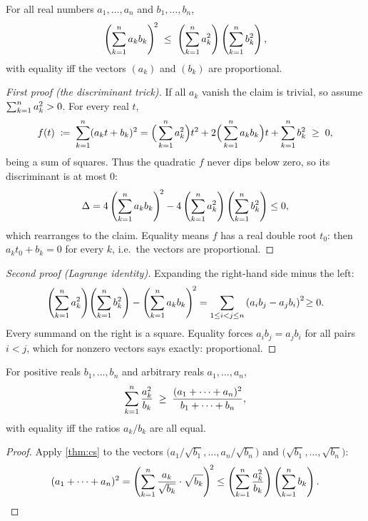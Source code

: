 \begin{theorem}\label{thm:cs}
For all real numbers $a_1, \dots, a_n$ and $b_1, \dots, b_n$,
\[
  \left( \sum_{k=1}^{n} a_k b_k \right)^{\!2}
  \;\le\;
  \left( \sum_{k=1}^{n} a_k^2 \right)
  \left( \sum_{k=1}^{n} b_k^2 \right),
\]
with equality iff the vectors $(a_k)$ and $(b_k)$ are proportional.
\end{theorem}

\begin{proof}[First proof (the discriminant trick)]
If all $a_k$ vanish the claim is trivial, so assume
$\sum_{k=1}^{n} a_k^2 > 0$. For every real $t$,
\[
  f(t) \;\coloneqq\; \sum_{k=1}^{n} (a_k t + b_k)^2
  = \Big(\sum_{k=1}^{n} a_k^2\Big) t^2
  + 2\Big(\sum_{k=1}^{n} a_k b_k\Big) t
  + \sum_{k=1}^{n} b_k^2
  \;\ge\; 0,
\]
being a sum of squares. Thus the quadratic $f$ never dips below zero,
so its discriminant is at most $0$:
\[
  \Delta = 4\left(\sum_{k=1}^{n} a_k b_k\right)^{\!2}
  - 4\left(\sum_{k=1}^{n} a_k^2\right)\left(\sum_{k=1}^{n} b_k^2\right) \le 0,
\]
which rearranges to the claim. Equality means $f$ has a real double
root $t_0$: then $a_k t_0 + b_k = 0$ for every $k$, i.e.\ the vectors
are proportional.
\end{proof}

\begin{proof}[Second proof (Lagrange identity)]
Expanding the right-hand side minus the left:
\[
  \left(\sum_{k=1}^{n} a_k^2\right)\!\left(\sum_{k=1}^{n} b_k^2\right)
  - \left(\sum_{k=1}^{n} a_k b_k\right)^{\!2}
  = \sum_{1 \le i < j \le n} \left( a_i b_j - a_j b_i \right)^2 \!\ge 0 .
\]
Every summand on the right is a square. Equality forces
$a_i b_j = a_j b_i$ for all pairs $i<j$, which for nonzero vectors
says exactly: proportional.
\end{proof}

\begin{corollary}\label{cor:engel}
For positive reals $b_1, \dots, b_n$ and arbitrary reals
$a_1, \dots, a_n$,
\[
  \sum_{k=1}^{n} \frac{a_k^2}{b_k}
  \;\ge\;
  \frac{(a_1 + \cdots + a_n)^2}{b_1 + \cdots + b_n},
\]
with equality iff the ratios $a_k / b_k$ are all equal.
\end{corollary}

\begin{proof}
Apply \cref{thm:cs} to the vectors
$\big(a_1/\sqrt{b_1}, \dots, a_n/\sqrt{b_n}\big)$ and
$\big(\sqrt{b_1}, \dots, \sqrt{b_n}\big)$:
\[
  (a_1 + \cdots + a_n)^2
  = \left(\sum_{k=1}^{n} \frac{a_k}{\sqrt{b_k}} \cdot \sqrt{b_k}\right)^{\!2}
  \le \left(\sum_{k=1}^{n} \frac{a_k^2}{b_k}\right)
       \left(\sum_{k=1}^{n} b_k\right). \qedhere
\]
\end{proof}

